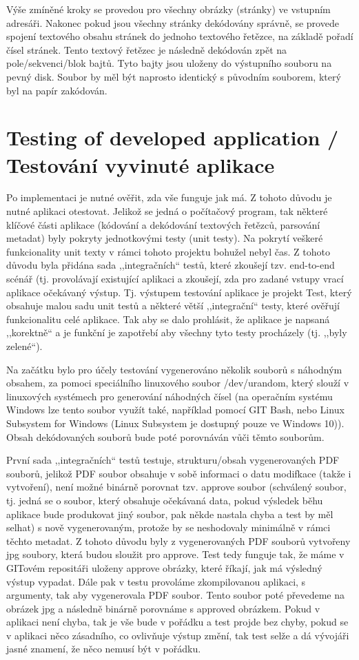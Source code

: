 \documentclass[conference]{IEEEtran}
\begin{document}
Výše zmíněné kroky se provedou pro všechny obrázky (stránky) ve vstupním adresáři. Nakonec pokud jsou všechny stránky dekódovány správně, se provede spojení textového obsahu stránek do jednoho textového řetězce, na základě pořadí čísel stránek. Tento textový řetězec je následně dekódován zpět na pole/sekvenci/blok bajtů. Tyto bajty jsou uloženy do výstupního souboru na pevný disk. Soubor by měl být naprosto identický s původním souborem, který byl na papír zakódován.

\section{Testing of developed application / Testování vyvinuté aplikace}

Po implementaci je nutné ověřit, zda vše funguje jak má. Z tohoto důvodu je nutné aplikaci otestovat. Jelikož se jedná o počítačový program, tak některé klíčové části aplikace (kódování a dekódování textových řetězců, parsování metadat) byly pokryty jednotkovými testy (unit testy). Na pokrytí veškeré funkcionality unit texty v rámci tohoto projektu bohužel nebyl čas. Z tohoto důvodu byla přidána sada ,,integračních`` testů, které zkoušejí tzv. end-to-end scénář (tj. provolávají existující aplikaci a zkoušejí, zda pro zadané vstupy vrací aplikace očekávaný výstup. Tj. výstupem testování aplikace je projekt Test, který obsahuje malou sadu unit testů a některé větší ,,integrační`` testy, které ověřují funkcionalitu celé aplikace. Tak aby se dalo prohlásit, že aplikace je napsaná ,,korektně`` a je funkční je zapotřebí aby všechny tyto testy procházely (tj. ,,byly zelené``).

Na začátku bylo pro účely testování vygenerováno několik souborů s náhodným obsahem, za pomoci speciálního linuxového soubor /dev/urandom, který slouží v linuxových systémech pro generování náhodných čísel (na operačním systému Windows lze tento soubor využít také, například pomocí GIT Bash, nebo Linux Subsystem for Windows (Linux Subsystem je dostupný pouze ve Windows 10)). Obsah dekódovaných souborů bude poté porovnáván vůči těmto souborům.

První sada ,,integračních`` testů testuje, strukturu/obsah vygenerovaných PDF souborů, jelikož PDF soubor obsahuje v sobě informaci o datu modifkace (takže i vytvoření), není možné binárně porovnat tzv. approve soubor (schválený soubor, tj. jedná se o soubor, který obsahuje očekávaná data, pokud výsledek běhu aplikace bude produkovat jiný soubor, pak někde nastala chyba a test by měl selhat) s nově vygenerovaným, protože by se neshodovaly minimálně v rámci těchto metadat. Z tohoto důvodu byly z vygenerovaných PDF souborů vytvořeny jpg soubory, která budou sloužit pro approve. Test tedy funguje tak, že máme v GITovém repositáři uloženy approve obrázky, které říkají, jak má výsledný výstup vypadat. Dále pak v testu provoláme zkompilovanou aplikaci, s argumenty, tak aby vygenerovala PDF soubor. Tento soubor poté převedeme na obrázek jpg a následně binárně porovnáme s approved obrázkem. Pokud v aplikaci není chyba, tak je vše bude v pořádku a test projde bez chyby, pokud se v aplikaci něco zásadního, co ovlivňuje výstup změní, tak test selže a dá vývojáři jasné znamení, že něco nemusí být v pořádku.
\end{document}
